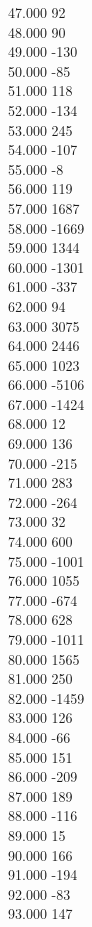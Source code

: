 { 47.000	92 \\
 48.000	90 \\
 49.000	-130 \\
 50.000	-85 \\
 51.000	118 \\
 52.000	-134 \\
 53.000	245 \\
 54.000	-107 \\
 55.000	-8 \\
 56.000	119 \\
 57.000	1687 \\
 58.000	-1669 \\
 59.000	1344 \\
 60.000	-1301 \\
 61.000	-337 \\
 62.000	94 \\
 63.000	3075 \\
 64.000	2446 \\
 65.000	1023 \\
 66.000	-5106 \\
 67.000	-1424 \\
 68.000	12 \\
 69.000	136 \\
 70.000	-215 \\
 71.000	283 \\
 72.000	-264 \\
 73.000	32 \\
 74.000	600 \\
 75.000	-1001 \\
 76.000	1055 \\
 77.000	-674 \\
 78.000	628 \\
 79.000	-1011 \\
 80.000	1565 \\
 81.000	250 \\
 82.000	-1459 \\
 83.000	126 \\
 84.000	-66 \\
 85.000	151 \\
 86.000	-209 \\
 87.000	189 \\
 88.000	-116 \\
 89.000	15 \\
 90.000	166 \\
 91.000	-194 \\
 92.000	-83 \\
 93.000	147 \\
}
